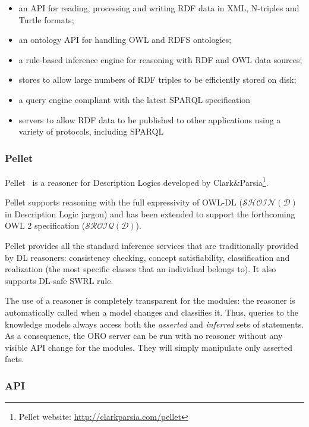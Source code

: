 \begin{itemize}
    \item an API for reading, processing and writing RDF data in XML, N-triples
    and Turtle formats;
    \item an ontology API for handling OWL and RDFS ontologies;
    \item a rule-based inference engine for reasoning with RDF and OWL data
    sources;
    \item stores to allow large numbers of RDF triples to be efficiently stored
    on disk;
    \item a query engine compliant with the latest SPARQL specification
    \item servers to allow RDF data to be published to other applications using
    a variety of protocols, including SPARQL
\end{itemize}

\subsubsection{Pellet}
\label{sect|pellet}

{\sc Pellet}~\cite{Sirin2007} is a reasoner for Description Logics developed by
Clark\&Parsia\footnote{{\sc Pellet} website:
\url{http://clarkparsia.com/pellet}}.

Pellet supports reasoning with the full expressivity of OWL-DL
($\mathcal{SHOIN(D)}$ in Description Logic jargon) and has been extended to
support the forthcoming OWL 2 specification ($\mathcal{SROIQ(D)}$).

Pellet provides all the standard inference services that are traditionally
provided by DL reasoners: consistency checking, concept satisfiability,
classification and realization (the most specific classes that an individual
belongs to). It also supports DL-safe SWRL rule.


The use of a reasoner is completely transparent for the modules: the reasoner
is automatically called when a model changes and classifies it. Thus, queries
to the knowledge models always access both the \emph{asserted} and
\emph{inferred} sets of statements. As a consequence, the ORO server can be run
with no reasoner without any visible API change for the modules. They will
simply manipulate only asserted facts.

\subsubsection{API}

